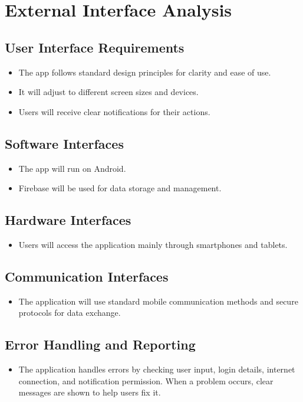 \section{External Interface Analysis}
\label{sec:external-interface}

\subsection{User Interface Requirements}
\begin{itemize}
    \item The app follows standard design principles for clarity and ease of use.
    \item It will adjust to different screen sizes and devices.
    \item Users will receive clear notifications for their actions.
\end{itemize}

\subsection{Software Interfaces}
\begin{itemize}
    \item The app will run on Android.
    \item Firebase will be used for data storage and management.
\end{itemize}

\subsection{Hardware Interfaces}
\begin{itemize}
    \item Users will access the application mainly through smartphones and tablets.
\end{itemize}

\subsection{Communication Interfaces}
\begin{itemize}
    \item The application will use standard mobile communication methods and secure protocols for data exchange.
\end{itemize}

\subsection{Error Handling and Reporting}
\begin{itemize}
    \item The application handles errors by checking user input, login details, internet connection, and notification permission. When a problem occurs, clear messages are shown to help users fix it.
\end{itemize}

